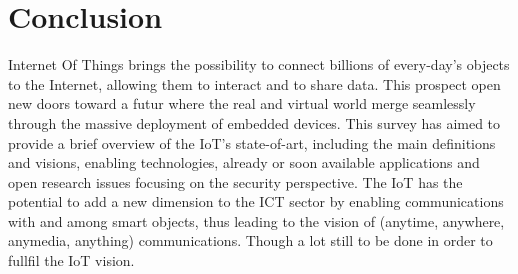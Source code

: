 \documentclass[10pt, twocolumn]{article}
\begin{document}
\section{Conclusion}
Internet Of Things brings the possibility to connect billions of every-day's objects to the Internet, allowing them to interact and to share data. This prospect open new doors toward a futur where the real and virtual world merge seamlessly through the massive deployment of embedded devices. This survey has aimed to provide a brief overview of the IoT's state-of-art, including the main definitions and visions, enabling technologies, already or soon available applications and open research issues focusing on the security perspective. The IoT has the potential to add a new dimension to the ICT sector by enabling communications with and among smart objects, thus leading to the vision of (anytime, anywhere, anymedia, anything) communications. Though a lot still to be done in order to fullfil the IoT vision.
 
 
\end{document}
